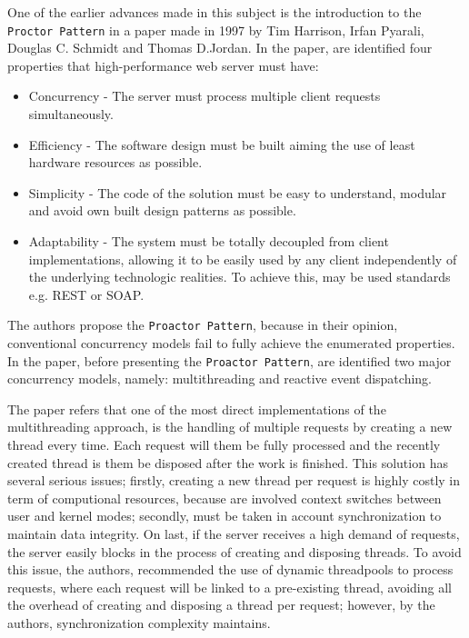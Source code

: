 One of the earlier advances made in this subject is the introduction to the \texttt{Proctor Pattern} in a paper made in 1997 by Tim Harrison, Irfan Pyarali, Douglas C. Schmidt and Thomas D.Jordan. 
In the paper, are identified four properties that high-performance web server must have: 
\begin{itemize}
	\item Concurrency - The server must process multiple client requests simultaneously.\\
	\item Efficiency - The software design must be built aiming the use of least hardware resources as possible. \\
	\item Simplicity - The code of the solution must be easy to understand, modular and avoid own built design patterns as possible. \\
    \item Adaptability - The system must be totally decoupled from client implementations, allowing it to be easily used by any client independently of the underlying technologic realities. To achieve this, may be used standards e.g. REST or SOAP.\\
\end{itemize}

The authors propose the \texttt{Proactor Pattern}, because in their opinion, conventional concurrency models fail to fully achieve the enumerated properties. In the paper, before presenting the \texttt{Proactor Pattern}, are identified two major concurrency models, namely: multithreading and reactive event dispatching. 

The paper refers that one of the most direct implementations of the multithreading approach, is the handling of multiple requests by creating a new thread every time. Each request will them be fully processed and the recently  created thread is them be disposed after the work is finished. 
This solution has several serious issues; firstly, creating a new thread per request is highly costly in term of computional resources,
because are involved context switches between user and kernel modes; secondly, must be taken in account synchronization to maintain data integrity. 
On last, if the server receives a high demand of requests, the server easily blocks in the process of creating and disposing threads. 
To avoid this issue, the authors, recommended the use of dynamic threadpools to process requests, where each request will be linked to a pre-existing thread, avoiding all the overhead of creating and disposing a thread per request;
however, by the authors, synchronization complexity maintains.

